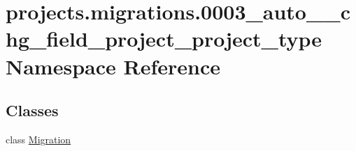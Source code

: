 \hypertarget{namespaceprojects_1_1migrations_1_10003__auto____chg__field__project__project__type}{\section{projects.\-migrations.0003\-\_\-auto\-\_\-\-\_\-chg\-\_\-field\-\_\-project\-\_\-project\-\_\-type Namespace Reference}
\label{namespaceprojects_1_1migrations_1_10003__auto____chg__field__project__project__type}
}
\subsection*{Classes}
\begin{DoxyCompactItemize}
\item 
class \hyperlink{classprojects_1_1migrations_1_10003__auto____chg__field__project__project__type_1_1_migration}{Migration}
\end{DoxyCompactItemize}
